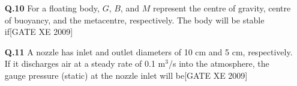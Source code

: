 \documentclass[journal,12pt,onecolumn]{IEEEtran}
\theoremstyle{remark}
\begin{document}
\begin{enumerate}
\begin{enumerate}
\vspace{0.3cm}

\item[\textbf{Q.10}] For a floating body, $G$, $B$, and $M$ represent the centre of gravity, centre of buoyancy, and the metacentre, respectively. The body will be stable if\hfill[GATE XE 2009]

\begin{enumerate}
\end{enumerate}

\vspace{0.3cm}

\item[\textbf{Q.11}] A nozzle has inlet and outlet diameters of 10 cm and 5 cm, respectively. If it discharges air at a steady rate of 0.1 m$^3$/s into the atmosphere, the gauge pressure (static) at the nozzle inlet will be\hfill[GATE XE 2009]

\begin{enumerate}
\end{enumerate}


\vspace{0.3cm}


\end{enumerate}
\end{enumerate}
\end{document}
